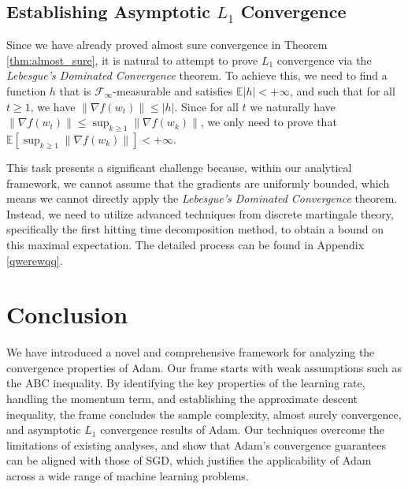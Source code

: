 \documentclass{article} %
\begin{document}
\subsection{ Establishing Asymptotic \( L_1 \) Convergence}\label{sec_3}

Since we have already proved almost sure convergence in Theorem \ref{thm:almost_sure}, it is natural to attempt to prove \( L_1 \) convergence via the \emph{Lebesgue's Dominated Convergence} theorem. To achieve this, we need to find a function \( h \) that is \( \mathscr{F}_{\infty} \)-measurable and satisfies \( \mathbb{E}|h| < +\infty \), and such that for all \( t \geq 1 \), we have \( \|\nabla f(w_{t})\| \leq |h| \). Since for all \( t \) we naturally have \( \|\nabla f(w_{t})\| \leq \sup_{k \geq 1} \|\nabla f(w_{k})\| \), we only need to prove that \( \mathbb{E}[\sup_{k \geq 1} \|\nabla f(w_{k})\|] < +\infty \). 

This task presents a significant challenge because, within our analytical framework, we cannot assume that the gradients are uniformly bounded, which means we cannot directly apply the \emph{Lebesgue's Dominated Convergence} theorem. Instead, we need to utilize advanced techniques from discrete martingale theory, specifically the first hitting time decomposition method, to obtain a bound on this maximal expectation. The detailed process can be found in Appendix \ref{qwerewqq}.

\section{Conclusion}

We have introduced a novel and comprehensive framework for analyzing the convergence properties of Adam. Our frame starts with weak assumptions such as the ABC inequality.
By identifying the key properties of the learning rate, handling the momentum term, and establishing the approximate descent inequality, the frame concludes the sample complexity, almost surely convergence, and asymptotic \( L_1 \) convergence results of Adam. Our techniques overcome the limitations of existing analyses, and show that Adam's convergence guarantees can be aligned with those of SGD, which justifies the applicability of Adam across a wide range of machine learning problems.


\end{document}
